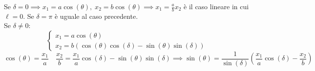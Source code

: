 Se $\delta=0\implies x_1= a\cos(\theta),\;x_2=b\cos(\theta)\implies x_1=\frac{a}{b}x_2$ è il caso lineare in cui $\ell = 0$.
Se $\delta= \pi$ è uguale al caso precedente.\\
Se $\delta\neq 0$:
\begin{equation*}
    \begin{cases}
        x_1 = a\cos(\theta)\\
        x_2 = b(\cos(\theta)\cos(\delta)-\sin(\theta)\sin(\delta))
    \end{cases}
\end{equation*}
\begin{equation}
    \cos(\theta)=\frac{x_1}{a} \quad \frac{x_2}{b}= \frac{x_1}{a}\cos(\delta)-\sin(\theta)\sin(\delta)\implies
    \sin(\theta)= \frac{1}{\sin(\delta)}\left(  \frac{x_1}{a}\cos(\delta)-\frac{x_2}{b}\right)
\end{equation}

